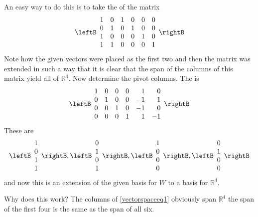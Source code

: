 \begin{solution}
An easy way to do this is to take the {\rref} of the matrix 
\begin{equation}
\leftB 
\begin{array}{cccccc}
1 & 0 & 1 & 0 & 0 & 0 \\ 
0 & 1 & 0 & 1 & 0 & 0 \\ 
1 & 0 & 0 & 0 & 1 & 0 \\ 
1 & 1 & 0 & 0 & 0 & 1
\end{array}
\rightB  \label{vectorspaceeq1}
\end{equation}
Note how the given vectors were placed as the first two and then the matrix
was extended in such a way that it is clear that the span of the columns of
this matrix yield all of $\mathbb{R}^{4}$. Now determine the pivot columns.
The {\rref} is 
\begin{equation}
\leftB 
\begin{array}{rrrrrr}
1 & 0 & 0 & 0 & 1 & 0 \\ 
0 & 1 & 0 & 0 & -1 & 1 \\ 
0 & 0 & 1 & 0 & -1 & 0 \\ 
0 & 0 & 0 & 1 & 1 & -1
\end{array}
\rightB  \label{vectorspaceeq2}
\end{equation}
These are 
\begin{equation*}
\leftB 
\begin{array}{c}
1 \\ 
0 \\ 
1 \\ 
1
\end{array}
\rightB ,\leftB 
\begin{array}{c}
0 \\ 
1 \\ 
0 \\ 
1
\end{array}
\rightB ,\leftB 
\begin{array}{c}
1 \\ 
0 \\ 
0 \\ 
0
\end{array}
\rightB ,\leftB 
\begin{array}{c}
0 \\ 
1 \\ 
0 \\ 
0
\end{array}
\rightB
\end{equation*}
and now this is an extension of the given basis for $W$ to a basis for $
\mathbb{R}^{4}$.

Why does this work? The columns of \ref{vectorspaceeq1} obviously span $\mathbb{R}
^{4}$  the span of the first four is the same as the span of all
six.
\end{solution}
